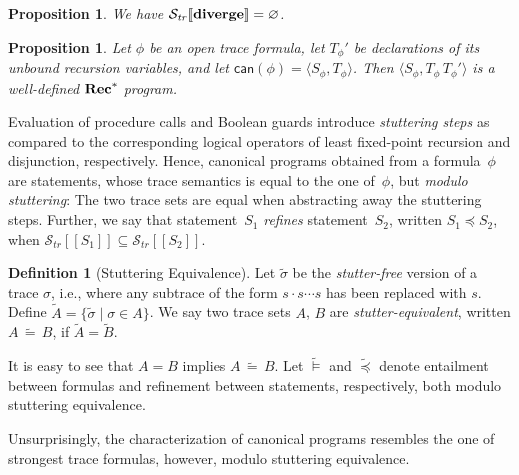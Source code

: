 \documentclass[10pt,a4paper]{amsart}
\newtheorem{proposition}[theorem]{Proposition}
\theoremstyle{definition}
\newtheorem{definition}[theorem]{Definition}
\newcommand{\denot}[1]{\left[\!\left[#1\right]\!\right]}
\newcommand{\trcdenot}[1]{\mathcal{S}_{\mathit{tr}}\!\denot{#1}}
\newcommand{\restr}[2]{\!\!\mid_{#1}^{#2}}
\newcommand{\can}[1]{\mathsf{can} (#1)}
\newcommand{\Rec}{\mbox{\bf Rec}}
\newcommand{\Abort}{\mbox{\bf diverge}}
\begin{document}

\begin{proposition}\label{prop:any}
  We have $\trcdenot{\Abort}=\varnothing$.
\end{proposition}

\begin{proposition}\label{prop:well}
  Let $\phi$ be an open trace formula, let $T_\phi'$ be declarations
  of its unbound recursion variables, and let
  $\can{\phi}=\langle S_\phi,T_\phi\rangle$. Then
  $\langle S_\phi,T_\phi\,T_\phi'\rangle$ is a well-defined
  $\Rec^\ast$ program.
\end{proposition}



Evaluation of procedure calls and Boolean guards introduce \emph{stuttering 
steps} as compared to the corresponding logical operators of least
fixed-point recursion and disjunction, respectively. Hence, canonical
programs obtained from a formula~$\phi$ are statements, whose trace
semantics is equal to the one of~$\phi$, but \emph{modulo stuttering}: 
The two trace sets are equal when abstracting away the stuttering steps.
%
Further, we say that statement~$S_1$ \emph{refines} statement~$S_2$,
written $S_1 \preceq S_2$, when $\trcdenot{S_1} \subseteq \trcdenot{S_2}$.

\begin{definition}[Stuttering Equivalence]
  Let $\tilde{\sigma}$ be the \emph{stutter-free} version of a trace
  $\sigma$, i.e., where any subtrace of the form $s\cdot s\cdots s$
  has been replaced with $s$. Define
  $\widetilde{A}=\{\tilde{\sigma}\mid\sigma\in A\}$.  We say two trace
  sets $A$, $B$ are \emph{stutter-equivalent}, written
  $A\,\widetilde{=}\,B$, if $\widetilde{A}=\widetilde{B}$.
\end{definition}

It is easy to see that $A=B$ implies $A\,\widetilde{=}\,B$.
%
Let $\widetilde{\models}$ and $\widetilde{\preceq}$ 
denote entailment between formulas and refinement between
statements, respectively, both modulo stuttering equivalence.

Unsurprisingly, the characterization of canonical programs resembles
the one of strongest trace formulas, however, modulo stuttering
equivalence.
\end{document}
